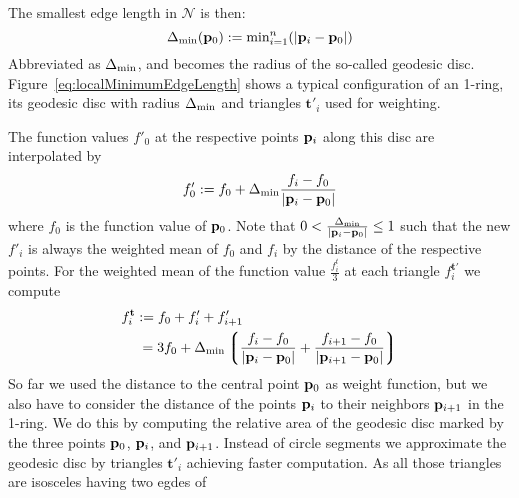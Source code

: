 The smallest edge length in $\mathcal{N}$ is then: 
\begin{equation}
	\Delta_\text{min}(\mathbf{p}_0) := \text{min}^n_{i=1} (|\mathbf{p}_i - \mathbf{p}_0|)
	\label{eq:localMinimumEdgeLength}
\end{equation}
Abbreviated as $\Delta_\text{min}$,  and becomes the radius of the
so-called geodesic disc. Figure~\ref{eq:localMinimumEdgeLength} shows 
a typical configuration of an 1-ring, its geodesic disc with radius 
$\Delta_\text{min}$ and triangles $\mathbf{t}'_i$ used for weighting.
\begin{figure}[ht]
\end{figure}
The function values $f'_0$ at the respective points $\mathbf{p}_i$ along 
this disc are interpolated by 
\begin{equation}
	f'_0 := f_0 + \Delta_\text{min}\frac{f_i - f_0}{|\mathbf{p}_i - \mathbf{p}_0|} 
\end{equation}
where $f_0$ is the function value of $\mathbf{p}_0$. Note that $0 < \frac{
\Delta_\text{min}}{|\mathbf{p}_i - \mathbf{p}_0|} \leq 1$ such that the new 
$f'_i$ is always the weighted mean of $f_0$ and $f_i$ by the distance of the
respective points. For the weighted mean of the function value $\frac{f_i^t}{3}$ at 
each triangle $f^{\mathbf{t}'}_i$ we compute
\begin{align}
	f^{\mathbf{t}}_i & := f_0 + f'_i + f'_{i+1} \\
	& \: = 3f_0 + \Delta_\text{min}\left\lgroup\frac{f_i - f_0}{|\mathbf{p}_i - \mathbf{p}_0|} + 
	\frac{f_{i+1} - f_0}{|\mathbf{p}_{i+1} - \mathbf{p}_0|}\right\rgroup
\end{align}
So far we used the distance to the central point $\mathbf{p}_0$ as weight 
function, but we also have to consider the distance of the points 
$\mathbf{p}_i$ to their neighbors $\mathbf{p}_{i+1}$ in the 1-ring. We do this 
by computing the relative area of the geodesic disc marked by the three points 
$\mathbf{p}_0$, $\mathbf{p}_i$, and $\mathbf{p}_{i+1}$. Instead of circle 
segments we approximate the geodesic disc by triangles $\mathbf{t}'_i$ achieving 
faster computation. As all those triangles are isosceles having two egdes of 

